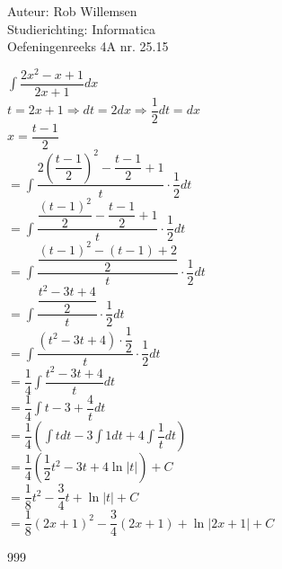 \documentclass[a4paper]{article}
\newcommand{\dint}{\displaystyle\int}
\begin{document}
\noindent \large Auteur: Rob Willemsen \\
\noindent \large Studierichting: Informatica \\
\noindent \large Oefeningenreeks 4A nr. 25.15 \\

\medskip

\normalsize

$\dint \dfrac{2x^2-x+1}{2x+1} dx$ \\

$t = 2x + 1 \Rightarrow dt = 2 dx \Rightarrow \dfrac{1}{2}dt = dx$ \\

$x = \dfrac{t-1}{2}$ \\

$= \dint \dfrac{2\left(\dfrac{t-1}{2}\right)^2 - \dfrac{t-1}{2} + 1}{t} \cdot \dfrac{1}{2} dt$ \\

$= \dint \dfrac{\dfrac{(t-1)^2}{2} - \dfrac{t-1}{2} + 1}{t} \cdot \dfrac{1}{2} dt$ \\

$= \dint \dfrac{\dfrac{(t-1)^2-(t-1)+2}{2}}{t} \cdot \dfrac{1}{2} dt$ \\

$= \dint \dfrac{\dfrac{t^2-3t+4}{2}}{t} \cdot \dfrac{1}{2} dt$ \\

$= \dint \dfrac{(t^2-3t+4) \cdot \dfrac{1}{2}}{t} \cdot \dfrac{1}{2} dt$ \\

$= \dfrac{1}{4} \dint \dfrac{t^2-3t+4}{t} dt$ \\

$= \dfrac{1}{4} \dint t - 3 + \dfrac{4}{t} dt$ \\

$= \dfrac{1}{4} \left( \dint t dt - 3 \dint 1 dt + 4 \dint \dfrac{1}{t} dt \right)$ \\

$= \dfrac{1}{4} \left( \dfrac{1}{2}t^2 - 3t + 4 \ln |t| \right) + C$ \\

$= \dfrac{1}{8}t^2 - \dfrac{3}{4}t + \ln |t| + C$ \\

$= \dfrac{1}{8}(2x+1)^2 - \dfrac{3}{4}(2x+1) + \ln |2x+1| + C$ \\

\begin{thebibliography}{999}
\end{thebibliography}
\end{document}
